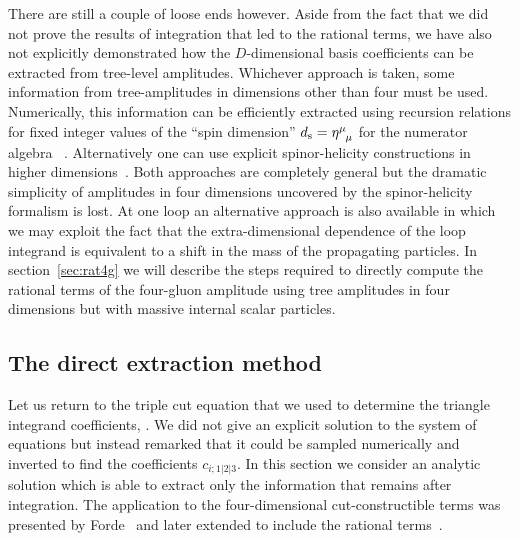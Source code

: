There are still a couple of loose ends however. Aside from the fact that we did
not prove the results of integration that led to the rational terms, we have
also not explicitly demonstrated how the $D$-dimensional basis coefficients can
be extracted from tree-level amplitudes. Whichever approach is taken, some
information from tree-amplitudes in dimensions other than four must be used.
Numerically, this information can be efficiently extracted using recursion
relations for fixed integer values of the ``spin dimension'' $d_{\rm s} = \eta^\mu_{\phantom{\mu} \mu}$ for the numerator algebra
~\cite{ch3_Giele:2008ve}. Alternatively one can use explicit spinor-helicity
constructions in higher dimensions~\cite{ch3_Bern:2010qa}. 
Both approaches are completely general but the dramatic simplicity of amplitudes in four dimensions
uncovered by the spinor-helicity formalism is lost. At one loop an alternative
approach is also available in which we may exploit the fact that the extra-dimensional
dependence of the loop integrand is equivalent to a shift in the mass of the
propagating particles. In section~\ref{sec:rat4g} we will describe the steps
required to directly compute the rational terms of the four-gluon amplitude
using tree amplitudes in four dimensions but with massive internal scalar
particles.

\subsection{The direct extraction method}

Let us return to the triple cut equation that we used to determine the triangle
integrand coefficients, . We did not give an explicit
solution to the system of equations but instead remarked that it could be
sampled numerically and inverted to find the coefficients $c_{i;1|2|3}$. In
this section we consider an analytic solution which is able to extract only the
information that remains after integration. The application to the
four-dimensional cut-constructible terms was presented by
Forde~\cite{ch3_Forde:2007mi} and later extended to include the rational
terms~\cite{ch3_Badger:2008cm}.

